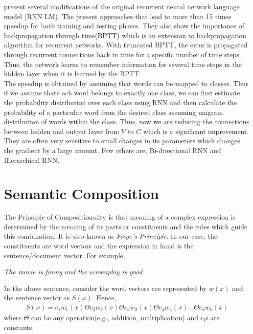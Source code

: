 \cite{Mikolov:11} present several modifications of the original recurrent neural network language model (RNN LM). The present approaches that lead to more than 15 times speedup for both training and testing phases. They also show the importance of backpropagation through time(BPTT) which is an extension to backpropagation algorithm for recurrent networks. With truncated BPTT, the error is propagated through recurrent connections back in time for a specific number of time steps. Thus, the network learns to remember information for several time steps in the hidden layer when it is learned by the BPTT.\\
The speedup is obtained by assuming that words can be mapped to classes. Thus if we assume thate ach word belongs to exactly one class, we can first estimate the probability distribution over each class using RNN and then calculate the probability of a particular word from the desired class assuming unigram distribution of words within the class. Thus, now we are reducing the connections between hidden and output layer from $V$ to $C$ which is a significant improvement.\\
They are often very sensitive to small changes in its parameters which changes the gradient by a large amount. Few others are, Bi-directional RNN and Hierarchical RNN.\\

\section{Semantic Composition}
\label{sec:composition}
The Principle of Compositionality is that meaning of a complex expression is determined by the meaning of its parts or constituents and the rules which guide this combination. It is also known as \emph{Frege's Principle}. In our case, the constituents are word vectors and the expression in hand is the sentence/document vector. For example,
\begin{center}
\emph{The movie is funny and the screenplay is good}
\end{center}
In the above sentence, consider the word vectors are represented by $w(x)$ and the sentence vector as $S(x)$. Hence,
\begin{align}
S(x) = c_1w_1(x) \Theta c_2w_2(x) \Theta c_3w_3(x) \Theta c_4w_4(x) \dots \Theta c_kw_k(x)
\end{align}
where $\Theta$ can be any operation(e.g., addition, multiplication) and $c_i$s are constants.

